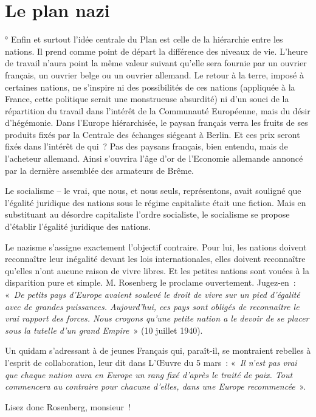 \documentclass[french,twoside]{book} %
\begin{document}
\section[Le plan nazi]{Le plan nazi}
° Enfin et surtout l’idée centrale du Plan est celle de la hiérarchie entre les nations. Il prend comme point de départ la différence des niveaux de vie. L’heure de travail n’aura point la même valeur suivant qu’elle sera fournie par un ouvrier français, un ouvrier belge ou un ouvrier allemand. Le retour à la terre, imposé à certaines nations, ne s’inspire ni des possibilités de ces nations (appliquée à la France, cette politique serait une monstrueuse absurdité) ni d’un souci de la répartition du travail dans l’intérêt de la Communauté Européenne, mais du désir d’hégémonie. Dans l’Europe hiérarchisée, le paysan français verra les fruits de ses produits fixés par la Centrale des échanges siégeant à Berlin. Et ces prix seront fixés dans l’intérêt de qui ? Pas des paysans français, bien entendu, mais de l’acheteur allemand. Ainsi s’ouvrira l’âge d’or de l’Economie allemande annoncé par la dernière assemblée des armateurs de Brême.\par
Le socialisme – le vrai, que nous, et nous seuls, représentons, avait souligné que l’égalité juridique des nations sous le régime capitaliste était une fiction. Mais en substituant au désordre capitaliste l’ordre socialiste, le socialisme se propose d’établir l’égalité juridique des nations.\par
Le nazisme s’assigne exactement l’objectif contraire. Pour lui, les nations doivent reconnaître leur inégalité devant les lois internationales, elles doivent reconnaître qu’elles n’ont aucune raison de vivre libres. Et les petites nations sont vouées à la disparition pure et simple. M. Rosenberg le proclame ouvertement. Jugez-en : « \emph{De petits pays d’Europe avaient soulevé le droit de vivre sur un pied d’égalité avec de grandes puissances. Aujourd’hui, ces pays sont obligés de reconnaître le vrai rapport des forces. Nous croyons qu’une petite nation a le devoir de se placer sous la tutelle d’un grand Empire} » (10 juillet 1940).\par
Un quidam s’adressant à de jeunes Français qui, paraît-il, se montraient rebelles à l’esprit de collaboration, leur dit dans L’Œuvre du 5 mars : « \emph{Il n’est pas vrai que chaque nation aura en Europe un rang fixé d’après le traité de paix. Tout commencera au contraire pour chacune d’elles, dans une Europe recommencée} ».\par
Lisez donc Rosenberg, monsieur !
\end{document}
